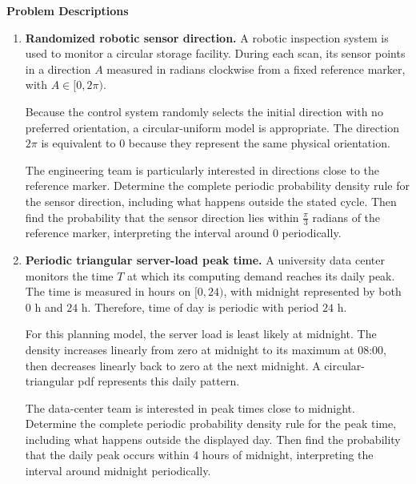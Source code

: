 	
	\vspace*{-15mm}
	
	\begin{center}
		{\large\bfseries Problem Descriptions}
	\end{center}
	
	\vspace{-4mm}
	
	\begin{enumerate}[
		leftmargin=*,
		itemsep=2pt,
		parsep=0pt,
		topsep=2pt
		]
		

		\item \textbf{Randomized robotic sensor direction.} A robotic inspection
		system is used to monitor a circular storage facility. During each scan,
		its sensor points in a direction $A$ measured in radians clockwise from
		a fixed reference marker, with $A\in[0,2\pi)$.
		
		Because the control system randomly selects the initial direction with
		no preferred orientation, a circular-uniform model is appropriate. The
		direction $2\pi$ is equivalent to $0$ because they represent the same
		physical orientation.
		
		The engineering team is particularly interested in directions close to
		the reference marker. Determine the complete periodic probability density
		rule for the sensor direction, including what happens outside the stated
		cycle. Then find the probability that the sensor direction lies within
		$\frac{\pi}{3}$ radians of the reference marker, interpreting the interval
		around $0$ periodically.
		
		\item \textbf{Periodic triangular server-load peak time.} A university
		data center monitors the time $T$ at which its computing demand reaches
		its daily peak. The time is measured in hours on $[0,24)$, with midnight
		represented by both $0$ h and $24$ h. Therefore, time of day is periodic
		with period $24$ h.
		
		For this planning model, the server load is least likely at midnight.
		The density increases linearly from zero at midnight to its maximum at
		08:00, then decreases linearly back to zero at the next midnight. A
		circular-triangular pdf represents this daily pattern.
		
		The data-center team is interested in peak times close to midnight.
		Determine the complete periodic probability density rule for the peak
		time, including what happens outside the displayed day. Then find the
		probability that the daily peak occurs within 4 hours of midnight,
		interpreting the interval around midnight periodically.
		
	\end{enumerate}
	
